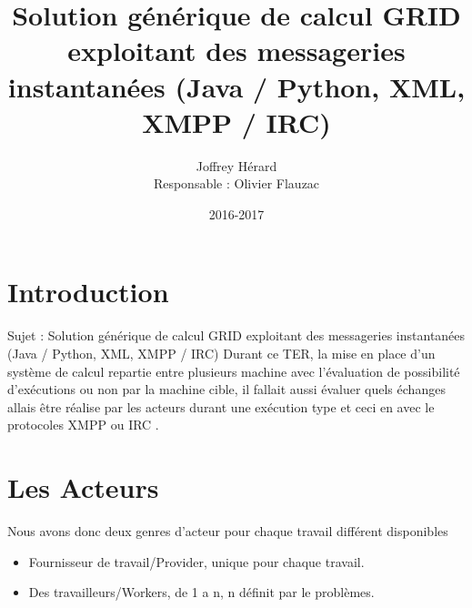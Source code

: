 \documentclass[11pt]{report}
\begin{document}
 \makeatletter
\def\maketitle{%
  \null
  \thispagestyle{empty}%
  \vfill
  \begin{center}\leavevmode
    \normalfont
    {\Huge \@title\par}%
    \vskip 3cm
    {\Large \@author\par}%
    \vskip 1cm
    {\Large \@date\par}%
  \end{center}%
  \vfill
  \null
  \cleardoublepage
  }
\makeatother
\title{Solution générique de calcul GRID exploitant des messageries instantanées
(Java / Python, XML, XMPP / IRC)}
\author{ Joffrey Hérard \begin{center}Responsable : Olivier Flauzac\end{center}}
\date{2016-2017}
\maketitle
 
\tableofcontents 

\newpage
\chapter{Introduction} 
Sujet : Solution générique de calcul GRID exploitant des messageries instantanées
(Java / Python, XML, XMPP / IRC)
Durant ce TER, la mise en place d'un système de calcul repartie entre plusieurs machine avec l’évaluation de possibilité d’exécutions ou non par la machine cible, il fallait aussi évaluer quels échanges allais être réalise par les acteurs durant une exécution type et ceci en avec le protocoles XMPP ou IRC . 
\newpage
\chapter{Les Acteurs} 
Nous avons donc deux genres d'acteur pour chaque travail différent disponibles 
\begin{itemize}
\item Fournisseur de travail/Provider, unique pour chaque travail.
\item Des travailleurs/Workers, de 1 a n, n définit par le problèmes.
\end{itemize}
\newpage
\end{document}
